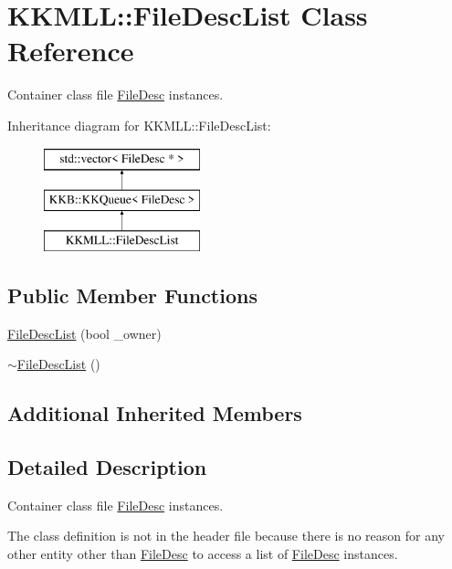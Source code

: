 \hypertarget{class_k_k_m_l_l_1_1_file_desc_list}{}\section{K\+K\+M\+LL\+:\+:File\+Desc\+List Class Reference}
\label{class_k_k_m_l_l_1_1_file_desc_list}


Container class file \textquotesingle{}\hyperlink{class_k_k_m_l_l_1_1_file_desc}{File\+Desc}\textquotesingle{} instances.  


Inheritance diagram for K\+K\+M\+LL\+:\+:File\+Desc\+List\+:\begin{figure}[H]
\begin{center}
\leavevmode
\includegraphics[height=3.000000cm]{class_k_k_m_l_l_1_1_file_desc_list}
\end{center}
\end{figure}
\subsection*{Public Member Functions}
\begin{DoxyCompactItemize}
\item 
\hyperlink{class_k_k_m_l_l_1_1_file_desc_list_a7fb7a63487e52635ea67a2b841b43bb8}{File\+Desc\+List} (bool \+\_\+owner)
\item 
\hyperlink{class_k_k_m_l_l_1_1_file_desc_list_ab45a8f7a0755d342bf13702005386053}{$\sim$\+File\+Desc\+List} ()
\end{DoxyCompactItemize}
\subsection*{Additional Inherited Members}


\subsection{Detailed Description}
Container class file \textquotesingle{}\hyperlink{class_k_k_m_l_l_1_1_file_desc}{File\+Desc}\textquotesingle{} instances. 

The class definition is not in the header file because there is no reason for any other entity other than \hyperlink{class_k_k_m_l_l_1_1_file_desc}{File\+Desc} to access a list of \hyperlink{class_k_k_m_l_l_1_1_file_desc}{File\+Desc} instances. 


